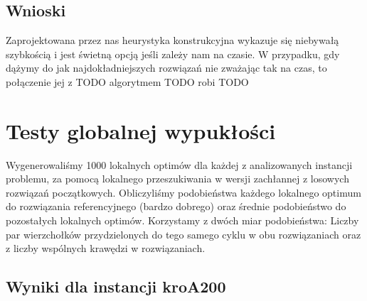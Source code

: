 \documentclass[11pt]{article}
\begin{document}
\subsection{Wnioski}\label{subsec:wnioski}
Zaprojektowana przez nas heurystyka konstrukcyjna wykazuje się niebywałą szybkością i jest świetną opcją jeśli zależy nam na czasie.
W przypadku, gdy dążymy do jak najdokładniejszych rozwiązań nie zważając tak na czas, to połączenie jej z TODO algorytmem TODO robi TODO


\section{Testy globalnej wypukłości}\label{sec:testy-globalnej-wypukosci}

Wygenerowaliśmy 1000 lokalnych optimów dla każdej z analizowanych instancji problemu, za pomocą lokalnego przeszukiwania w wersji zachłannej z losowych rozwiązań początkowych.
Obliczyliśmy podobieństwa każdego lokalnego optimum do rozwiązania referencyjnego (bardzo dobrego) oraz średnie podobieństwo do pozostałych lokalnych optimów.
Korzystamy z dwóch miar podobieństwa: Liczby par wierzchołków przydzielonych do tego samego cyklu w obu rozwiązaniach oraz z liczby wspólnych krawędzi w rozwiązaniach.

\subsection{Wyniki dla instancji kroA200}\label{subsec:wyniki-dla-instancji-kroa200}
\end{document}
